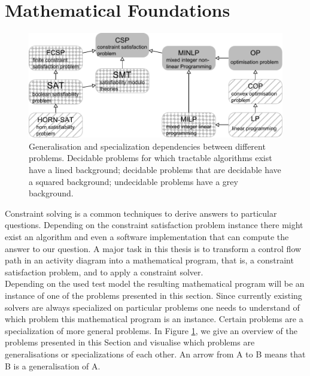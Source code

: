 \section{Mathematical Foundations}
\label{sec:Maths}
\begin{figure}
\begin{center}
\includegraphics[width=\textwidth]{./pics/ProblemLatice.pdf}
\end{center}
\caption{Generalisation and specialization dependencies between different problems. Decidable problems for which tractable algorithms exist have a lined background; decidable problems that are decidable have a squared background; undecidable problems have a grey background.}
\label{fig:problemLatice}
\end{figure}
Constraint solving is a common techniques to derive answers to particular questions. Depending on the constraint satisfaction problem instance there might exist an algorithm and even a software implementation that can compute the answer to our question. A major task in this thesis is to transform a control flow path in an activity diagram into a mathematical program, that is, a constraint satisfaction problem, and to apply a constraint solver. 
\\
Depending on the used test model the resulting mathematical program will be an instance of one of the problems presented in this section. Since currently existing solvers are always specialized on particular problems one needs to understand of which problem this mathematical program is an instance. Certain problems are a specialization of more general problems. In Figure \ref{fig:problemLatice}, we give an overview of the problems presented in this Section and visualise which problems are generalisations or specializations of each other. An arrow from \textsf{A} to \textsf{B} means that \textsf{B} is a generalisation of \textsf{A}.\\
